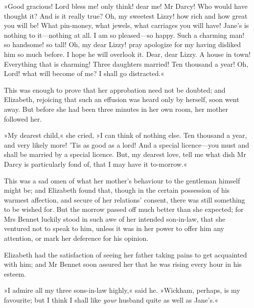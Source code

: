 »Good gracious! Lord bless me! only think! dear me! Mr Darcy! Who would have thought it? And is it really true? Oh, my sweetest Lizzy! how rich and how great you will be! What pin-money, what jewels, what carriages you will have! Jane's is nothing to it—nothing at all. I am so pleased—so happy. Such a charming man! so handsome! so tall! Oh, my dear Lizzy! pray apologize for my having disliked him so much before. I hope he will overlook it. Dear, dear Lizzy. A house in town! Everything that is charming! Three daughters married! Ten thousand a year! Oh, Lord! what will become of me? I shall go distracted.«

This was enough to prove that her approbation need not be doubted; and Elizabeth, rejoicing that such an effusion was heard only by herself, soon went away. But before she had been three minutes in her own room, her mother followed her.

»My dearest child,« she cried, »I can think of nothing else. Ten thousand a year, and very likely more! 'Tis as good as a lord! And a special licence—you must and shall be married by a special licence. But, my dearest love, tell me what dish Mr Darcy is particularly fond of, that I may have it to-morrow.«

This was a sad omen of what her mother's behaviour to the gentleman himself might be; and Elizabeth found that, though in the certain possession of his warmest affection, and secure of her relations' consent, there was still something to be wished for. But the morrow passed off much better than she expected; for Mrs Bennet luckily stood in such awe of her intended son-in-law, that she ventured not to speak to him, unless it was in her power to offer him any attention, or mark her deference for his opinion.

Elizabeth had the satisfaction of seeing her father taking pains to get acquainted with him; and Mr Bennet soon assured her that he was rising every hour in his esteem.

»I admire all my three sons-in-law highly,« said he. »Wickham, perhaps, is my favourite; but I think I shall like \textit{your} husband quite as well as Jane's.«